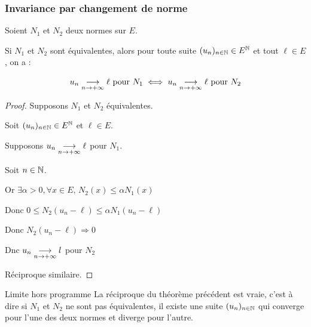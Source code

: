 \subsubsection{Invariance par changement de norme }

\begin{theorement}{}{}
    Soient $N_1$ et $N_2$ deux normes sur $E$. 

    Si $N_1$ et $N_2$ sont équivalentes, alors pour toute suite $(u_n)_{n \in \mathbb{N}} \in E^{\mathbb{N}}$ 
    et tout $\ell \in E$, on a :

    $$ u_n \underset{n \to +\infty}{\longrightarrow} \ell \text{ pour } N_1 \iff u_n \underset{n \to +\infty}{\longrightarrow} \ell \text{ pour } N_2 $$
\end{theorement}


\begin{proof}
    Supposons $N_1$ et $N_2$ équivalentes.

    Soit $(u_n)_{n \in \mathbb{N}} \in E^{\mathbb{N}}$ et $\ell \in E$.

    Supposons $u_n \underset{n \to +\infty}{\longrightarrow} \ell$ pour $N_1$. 

    Soit $n \in \mathbb{N}$. 

    Or $\exists \alpha > 0, \forall x \in E, \, N_2(x) \leqslant \alpha N_1(x)$

    Donc $0 \leqslant N_2(u_n - \ell) \leqslant \alpha N_1(u_n - \ell)$ 

    Donc $N_2(u_n - \ell) \Longrightarrow 0$

    Dnc $u_n \underset{n \to +\infty}{\longrightarrow} l$ pour $N_2$

    Réciproque similaire.
\end{proof}

\begin{theoreme}{Limite hors programme}{}
    La réciproque du théorème précédent est vraie, c'est à dire si $N_1$ et $N_2$ ne sont pas 
    équivalentes, il existe une suite $(u_n)_{n \in \mathbb{N}}$ qui converge pour l'une des deux normes 
    et diverge pour l'autre. 
\end{theoreme}


